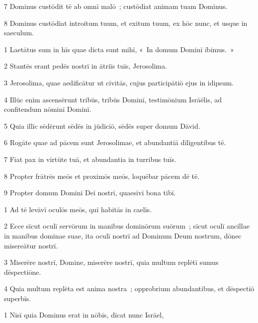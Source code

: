 \psalmVerse
  {\phantom{00}7}
  {Dominus custōdit tē ab omnī malō~; custōdiat animam tuam Dominus.}


\psalmVerse
  {\phantom{00}8}
  {Dominus custōdiat introitum tuum, et exitum tuum, ex hōc nunc, et usque in saeculum.}



\psalmVerse
  {\phantom{00}1}
  {Laetātus sum in hīs quae dicta sunt mihī, «~In domum Dominī ībimus.~»}


\psalmVerse
  {\phantom{00}2}
  {Stantēs erant pedēs nostrī in ātriīs tuīs, Jerosolima.}


\psalmVerse
  {\phantom{00}3}
  {Jerosolima, quae aedificātur ut cīvitās, cujus participātiō ejus in idipsum.}


\psalmVerse
  {\phantom{00}4}
  {Illūc enim ascensērunt tribūs, tribūs Dominī, testimōnium Isrāēlis, ad confitendum nōminī Dominī.}


\psalmVerse
  {\phantom{00}5}
  {Quia illīc sēdērunt sēdēs in jūdiciō, sēdēs super domum Dāvid.}


\psalmVerse
  {\phantom{00}6}
  {Rogāte quae ad pācem sunt Jerosolimae, et abundantiā dīligentibus tē.}


\psalmVerse
  {\phantom{00}7}
  {Fīat pax in virtūte tuā, et abundantia in turribus tuīs.}


\psalmVerse
  {\phantom{00}8}
  {Propter frātrēs meōs et proximōs meōs, loquēbar pācem dē tē.}


\psalmVerse
  {\phantom{00}9}
  {Propter domum Dominī Deī nostrī, quaesīvī bona tibī.}



\psalmVerse
  {\phantom{00}1}
  {Ad tē levāvī oculōs meōs, quī habitās in caelīs.}


\psalmVerse
  {\phantom{00}2}
  {Ecce sīcut oculī servōrum in manibus dominōrum suōrum~; sīcut oculī ancillae in manibus dominae suae, ita oculī nostrī ad Dominum Deum nostrum, dōnec misereātur nostrī.}


\psalmVerse
  {\phantom{00}3}
  {Miserēre nostrī, Domine, miserēre nostrī, quia multum replētī sumus dēspectiōne.}


\psalmVerse
  {\phantom{00}4}
  {Quia multum replēta est anima nostra~; opprobrium abundantibus, et dēspectiō superbīs.}



\psalmVerse
  {\phantom{00}1}
  {Nisī quia Dominus erat in nōbīs, dīcat nunc Isrāel,}


